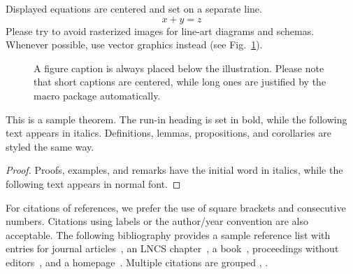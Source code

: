 \documentclass[runningheads]{llncs}
\begin{document}



\noindent Displayed equations are centered and set on a separate
line.
\begin{equation}
    x + y = z
\end{equation}
Please try to avoid rasterized images for line-art diagrams and
schemas. Whenever possible, use vector graphics instead (see
Fig.~\ref{fig1}).

\begin{figure}
    \caption{A figure caption is always placed below the illustration.
        Please note that short captions are centered, while long ones are
        justified by the macro package automatically.} \label{fig1}
\end{figure}

\begin{theorem}
    This is a sample theorem. The run-in heading is set in bold, while
    the following text appears in italics. Definitions, lemmas,
    propositions, and corollaries are styled the same way.
\end{theorem}
%
%
\begin{proof}
    Proofs, examples, and remarks have the initial word in italics,
    while the following text appears in normal font.
\end{proof}
For citations of references, we prefer the use of square brackets
and consecutive numbers. Citations using labels or the author/year
convention are also acceptable. The following bibliography provides
a sample reference list with entries for journal
articles~\cite{ref_article1}, an LNCS chapter~\cite{ref_lncs1}, a
book~\cite{ref_book1}, proceedings without editors~\cite{ref_proc1},
and a homepage~\cite{ref_url1}. Multiple citations are grouped
\cite{ref_article1,ref_lncs1,ref_book1},
\cite{ref_article1,ref_book1,ref_proc1,ref_url1}.
\end{document}
